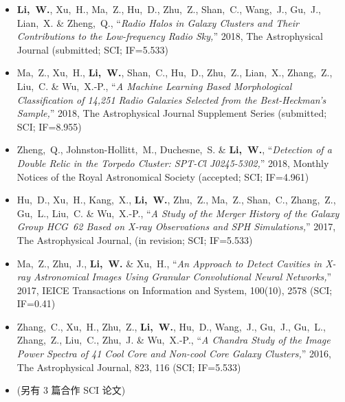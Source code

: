 \documentclass[zh]{resume}
\begin{document}
\begin{itemize}
  \small
  \item \textbf{Li,~W.}, Xu,~H., Ma,~Z., Hu,~D., Zhu,~Z., Shan,~C.,
    Wang,~J., Gu,~J., Lian,~X. \& Zheng,~Q.,
    \enquote{\it Radio Halos in Galaxy Clusters and Their Contributions
      to the Low-frequency Radio Sky,}
    2018, The Astrophysical Journal (submitted; SCI; IF=5.533)
  \item Ma,~Z., Xu,~H., \textbf{Li,~W.}, Shan,~C., Hu,~D., Zhu,~Z.,
    Lian,~X., Zhang,~Z., Liu,~C. \& Wu,~X.-P.,
    \enquote{\it A Machine Learning Based Morphological Classification
      of 14,251 Radio Galaxies Selected from the Best-Heckman's Sample,}
    2018, The Astrophysical Journal Supplement Series
    (submitted; SCI; IF=8.955)
  \item Zheng,~Q., Johnston-Hollitt,~M., Duchesne,~S. \& \textbf{Li,~W.},
    \enquote{\it Detection of a Double Relic in the Torpedo Cluster:
      SPT-Cl J0245-5302,}
    2018, Monthly Notices of the Royal Astronomical Society
    (accepted; SCI; IF=4.961)
  \item Hu,~D., Xu,~H., Kang,~X., \textbf{Li,~W.}, Zhu,~Z., Ma,~Z.,
    Shan,~C., Zhang,~Z., Gu,~L., Liu,~C. \& Wu,~X.-P.,
    \enquote{\it A Study of the Merger History of the Galaxy Group
      HCG~62 Based on X-ray Observations and SPH Simulations,}
    2017, The Astrophysical Journal, (in revision; SCI; IF=5.533)
  \item Ma,~Z., Zhu,~J., \textbf{Li,~W.} \& Xu,~H.,
    \enquote{\it An Approach to Detect Cavities in X-ray Astronomical
      Images Using Granular Convolutional Neural Networks,}
    2017, IEICE Transactions on Information and System, 100(10), 2578
    (SCI; IF=0.41)
  \item Zhang,~C., Xu,~H., Zhu,~Z., \textbf{Li,~W.}, Hu,~D., Wang,~J.,
    Gu,~J., Gu,~L., Zhang,~Z., Liu,~C., Zhu,~J. \& Wu,~X.-P.,
    \enquote{\it A Chandra Study of the Image Power Spectra of 41
      Cool Core and Non-cool Core Galaxy Clusters,}
    2016, The Astrophysical Journal, 823, 116 (SCI; IF=5.533)
  \item (另有 3 篇合作 SCI 论文)
\end{itemize}
\end{document}
